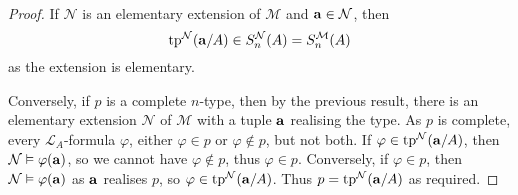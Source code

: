 \begin{proof}
    If \( \mathcal N \) is an elementary extension of \( \mathcal M \) and \( \vb a \in \mathcal N \), then
    \[ \operatorname{tp}^{\mathcal N}(\vb a/A) \in S_n^{\mathcal N}(A) = S_n^{\mathcal M}(A) \]
    as the extension is elementary.

    Conversely, if \( p \) is a complete \( n \)-type, then by the previous result, there is an elementary extension \( \mathcal N \) of \( \mathcal M \) with a tuple \( \vb a \) realising the type.
    As \( p \) is complete, every \( \mathcal L_A \)-formula \( \varphi \), either \( \varphi \in p \) or \( \varphi \notin p \), but not both.
    If \( \varphi \in \operatorname{tp}^{\mathcal N}(\vb a/A) \), then \( \mathcal N \vDash \varphi(\vb a) \), so we cannot have \( \varphi \notin p \), thus \( \varphi \in p \).
    Conversely, if \( \varphi \in p \), then \( \mathcal N \vDash \varphi(\vb a) \) as \( \vb a \) realises \( p \), so \( \varphi \in \operatorname{tp}^{\mathcal N}(\vb a/A) \).
    Thus \( p = \operatorname{tp}^{\mathcal N}(\vb a/A) \) as required.
\end{proof}
